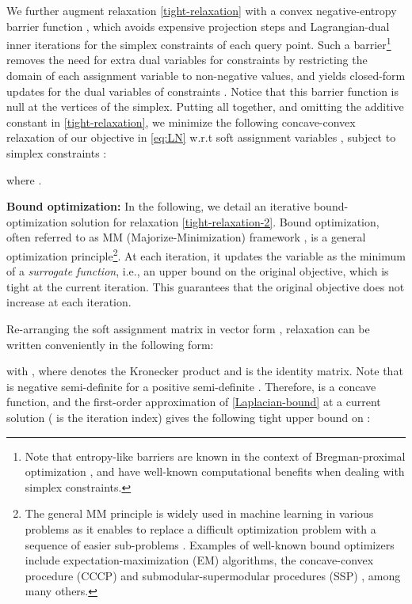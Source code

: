 \documentclass{article}
\begin{document}
We further augment relaxation \eqref{tight-relaxation} with a convex negative-entropy barrier function , 
which avoids expensive projection steps and Lagrangian-dual inner iterations for the simplex constraints of each query point. 
Such a barrier\footnote{Note that entropy-like barriers are known in the context of Bregman-proximal optimization \cite{Yuan2017}, and have well-known computational benefits when dealing with simplex constraints.} removes the need for extra dual variables for constraints  by 
restricting the domain of each assignment variable to non-negative values, and yields closed-form updates for the dual variables of 
constraints . Notice that this barrier function is null at the vertices of the simplex. Putting all together, and omitting the additive constant  in \eqref{tight-relaxation}, we minimize the following concave-convex relaxation of our objective in \eqref{eq:LN} w.r.t soft assignment variables , subject to simplex constraints :  

where .  

{\bf Bound optimization:} In the following, we detail an iterative bound-optimization solution for relaxation \eqref{tight-relaxation-2}. Bound optimization, often referred to as MM (Majorize-Minimization) framework \cite{lange2000optimization, Zhang2007}, is a general optimization principle\footnote{The general MM principle is widely used in machine learning in various problems as it enables to replace a difficult optimization problem with a sequence of easier sub-problems \cite{Zhang2007}. Examples of well-known bound optimizers include expectation-maximization (EM) algorithms, the concave-convex procedure (CCCP) \cite{Yuille2001} and submodular-supermodular procedures (SSP) \cite{Narasimhan2005}, among many others.}. At each iteration, it updates the variable as the minimum of a {\em surrogate function}, i.e., an upper bound on the original objective, which is tight at the current iteration. This guarantees that the original objective does not increase at each iteration.

Re-arranging the soft assignment matrix  in vector form , relaxation  can be written conveniently in the following form:

with , where  denotes the Kronecker product and  is the  identity matrix. Note that  is negative semi-definite for a positive semi-definite . Therefore,  is a concave function, and the first-order approximation of \eqref{Laplacian-bound} at a current solution  ( is the iteration index) gives the following tight upper bound on :
\end{document}
